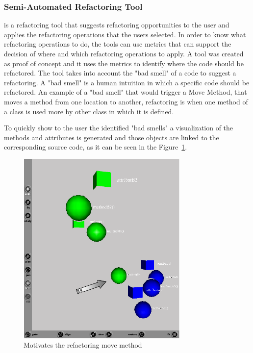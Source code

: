

\subsubsection{Semi-Automated Refactoring Tool}
is a refactoring tool that suggests refactoring opportunities to the user and applies the refactoring operations that the users selected. 
In order to know what refactoring operations to do, the tools can use metrics that can support the decision of where and which refactoring operations to apply. 
A tool \cite{simon2001metrics} was created as proof of concept and it uses the metrics to identify where the code should be refactored.
The tool takes into account the "bad smell" of a code to suggest a refactoring. 
A "bad smell" is a human intuition in which a specific code should be refactored. 
An example of a "bad smell" that would trigger a Move Method, that moves a method from one location to another, refactoring is when one method of a class is used more by other class in which it is defined.

To quickly show to the user the identified "bad smells" a visualization of the methods and attributes is generated and those objects are linked to the corresponding source code, as it can be seen in the Figure~\ref{fig:MetricsBasedRefactoring}. 

\begin{figure}[h!]
  \centering
  \includegraphics[width=0.75\textwidth]{img/metricsbasedrefactoring.png}
  \caption{Motivates the refactoring move method}
  \label{fig:MetricsBasedRefactoring}
\end{figure}

